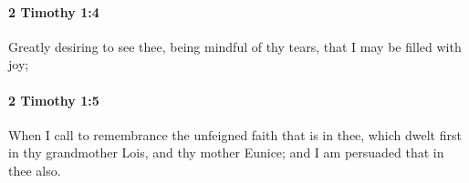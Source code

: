		\paragraph{2 Timothy 1:4} %
			\label{2TIMOTHY-1-4}

			Greatly desiring to see thee, being mindful of thy tears, that I may be filled with joy;

			\begin{framed}
			\scriptsize
				\begin{compactdesc}
					\item[SBLG] 
				\end{compactdesc}
			\end{framed}

		\paragraph{2 Timothy 1:5} %
			\label{2TIMOTHY-1-5}

			When I call to remembrance the unfeigned faith that is in thee, which dwelt first in thy grandmother Lois, and thy mother Eunice; and I am persuaded that in thee also.


